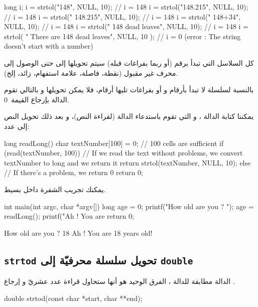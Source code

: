 \begin{Csource}
long i;
i = strtol("148", NULL, 10); // i = 148
i = strtol("148.215", NULL, 10); // i = 148
i = strtol(" 148.215", NULL, 10); // i = 148
i = strtol(" 148+34", NULL, 10); // i = 148
i = strtol(" 148 dead leaves", NULL, 10); // i = 148
i = strtol( " There are 148 dead leaves", NULL, 10 ); // i = 0 (error : The string doesn't start with a number)
\end{Csource}

كل السلاسل التي تبدأ برقم (أو ربما بفراغات قبله) سيتم تحويلها إلى
حتى الوصول إلى محرف غير مقبول (نقطة، فاصلة، علامة استفهام، زائد، إلخ).

بالنسبة لسلسلة لا تبدأ بأرقام و أو بفراغات تليها أرقام، فلا يمكن تحويلها و بالتالي تقوم الدالة بإرجاع القيمة~0.

يمكننا كتابة الدالة
،
و التي تقوم باستدعاء الدالة
(لقراءة النص)، و بعد ذلك تحويل النص إلى عدد:

\begin{Csource}
long readLong()
{
 	char textNumber[100] = {0}; // 100 cells are sufficient
 	if (read(textNumber, 100))
 	{
     		// If we read the text without problems, we convert textNumber to long and we return it
    		 return strtol(textNumber, NULL, 10);
 	}
 	else
 	{
    		 // If there's a problem, we return 0
     		return 0;
	 }
}
\end{Csource}

يمكنك تجريب الشفرة داخل
بسيط.

\begin{Csource}
int main(int argc, char *argv[])
{
 	long age = 0;
 	printf("How old are you ? ");
 	age = readLong();
 	printf("Ah ! You are %
 	return 0;
}
\end{Csource}

\begin{Console}
How old are you ? 18
Ah ! You are 18 years old!
\end{Console}

\subsection{\texttt{strtod} تحويل سلسلة محرفيّة إلى \texttt{double}}

الدالة
مطابقة للدالة
،
الفرق الوحيد هو أنها ستحاول قراءة عدد عشريّ و إرجاع
.

\begin{Csource}
double strtod(const char *start, char **end);
\end{Csource}

